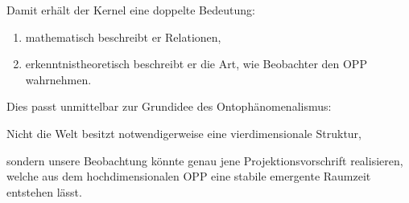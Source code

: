 Damit erhält der Kernel eine doppelte Bedeutung:

\begin{enumerate}
\item mathematisch beschreibt er Relationen,
\item erkenntnistheoretisch beschreibt er die Art,
wie Beobachter den OPP wahrnehmen.
\end{enumerate}

Dies passt unmittelbar zur Grundidee des
Ontophänomenalismus:

Nicht die Welt besitzt notwendigerweise
eine vierdimensionale Struktur,

sondern unsere Beobachtung könnte genau jene
Projektionsvorschrift realisieren,
welche aus dem hochdimensionalen OPP
eine stabile emergente Raumzeit entstehen lässt.

